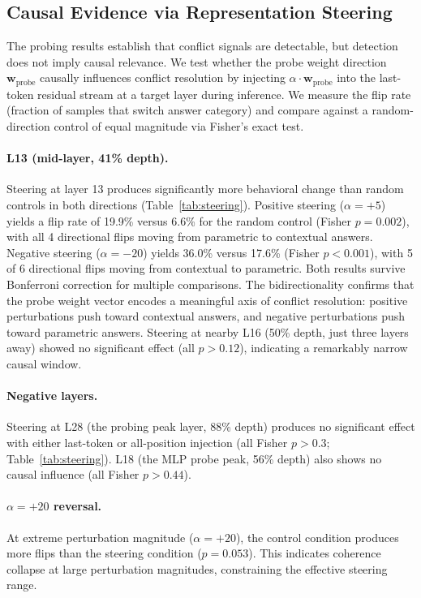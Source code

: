 \subsection{Causal Evidence via Representation Steering}
\label{sec:steering}

The probing results establish that conflict signals are detectable, but detection does not imply causal relevance.
We test whether the probe weight direction $\mathbf{w}_{\text{probe}}$ causally influences conflict resolution by injecting $\alpha \cdot \mathbf{w}_{\text{probe}}$ into the last-token residual stream at a target layer during inference.
We measure the flip rate (fraction of samples that switch answer category) and compare against a random-direction control of equal magnitude via Fisher's exact test.

\paragraph{L13 (mid-layer, 41\% depth).}
Steering at layer 13 produces significantly more behavioral change than random controls in both directions (Table~\ref{tab:steering}).
Positive steering ($\alpha = +5$) yields a flip rate of 19.9\% versus 6.6\% for the random control (Fisher $p = 0.002$), with all 4 directional flips moving from parametric to contextual answers.
Negative steering ($\alpha = -20$) yields 36.0\% versus 17.6\% (Fisher $p < 0.001$), with 5 of 6 directional flips moving from contextual to parametric.
Both results survive Bonferroni correction for multiple comparisons.
The bidirectionality confirms that the probe weight vector encodes a meaningful axis of conflict resolution: positive perturbations push toward contextual answers, and negative perturbations push toward parametric answers.
Steering at nearby L16 (50\% depth, just three layers away) showed no significant effect (all $p > 0.12$), indicating a remarkably narrow causal window.

\paragraph{Negative layers.}
Steering at L28 (the probing peak layer, 88\% depth) produces no significant effect with either last-token or all-position injection (all Fisher $p > 0.3$; Table~\ref{tab:steering}).
L18 (the MLP probe peak, 56\% depth) also shows no causal influence (all Fisher $p > 0.44$).

\paragraph{$\alpha = +20$ reversal.}
At extreme perturbation magnitude ($\alpha = +20$), the control condition produces more flips than the steering condition ($p = 0.053$).
This indicates coherence collapse at large perturbation magnitudes, constraining the effective steering range.

